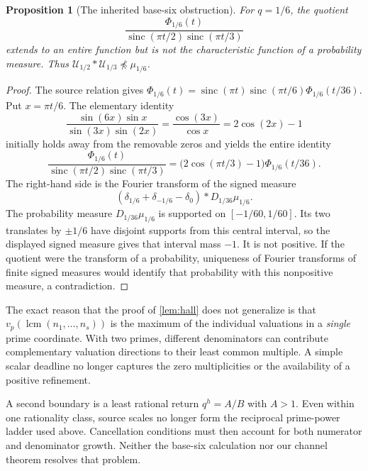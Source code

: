 \documentclass[11pt,letterpaper]{article}
\newtheorem{proposition}[theorem]{Proposition}
\theoremstyle{definition}
\theoremstyle{remark}
\newcommand{\Un}{\mathcal U}
\newcommand{\sinc}{\operatorname{sinc}}
\newcommand{\lcm}{\operatorname{lcm}}
\numberwithin{equation}{section}
\begin{document}
\begin{proposition}[The inherited base-six obstruction]\label{prop:base6}
For $q=1/6$, the quotient
\[
 \frac{\Phi_{1/6}(t)}{\sinc(\pi t/2)\sinc(\pi t/3)}
\]
extends to an entire function but is not the characteristic function of a probability measure. Thus $\Un_{1/2}*\Un_{1/3}\npreceq\mu_{1/6}$.
\end{proposition}
\begin{proof}
The source relation gives
$\Phi_{1/6}(t)=\sinc(\pi t)\sinc(\pi t/6)\Phi_{1/6}(t/36)$. Put $x=\pi t/6$. The elementary identity
\[
 \frac{\sin(6x)\sin x}{\sin(3x)\sin(2x)}
 =\frac{\cos(3x)}{\cos x}=2\cos(2x)-1
\]
initially holds away from the removable zeros and yields the entire identity
\begin{equation}\label{eq:base6}
 \frac{\Phi_{1/6}(t)}{\sinc(\pi t/2)\sinc(\pi t/3)}
 =\bigl(2\cos(\pi t/3)-1\bigr)\Phi_{1/6}(t/36).
\end{equation}
The right-hand side is the Fourier transform of the signed measure
\[
 (\delta_{1/6}+\delta_{-1/6}-\delta_0)*D_{1/36}\mu_{1/6}.
\]
The probability measure $D_{1/36}\mu_{1/6}$ is supported on $[-1/60,1/60]$. Its two translates by $\pm1/6$ have disjoint supports from this central interval, so the displayed signed measure gives that interval mass $-1$. It is not positive. If the quotient were the transform of a probability, uniqueness of Fourier transforms of finite signed measures would identify that probability with this nonpositive measure, a contradiction.
\end{proof}

The exact reason that the proof of \cref{lem:hall} does not generalize is that $v_p(\lcm(n_1,\ldots,n_s))$ is the maximum of the individual valuations in a \emph{single} prime coordinate. With two primes, different denominators can contribute complementary valuation directions to their least common multiple. A simple scalar deadline no longer captures the zero multiplicities or the availability of a positive refinement.

A second boundary is a least rational return $q^h=A/B$ with $A>1$. Even within one rationality class, source scales no longer form the reciprocal prime-power ladder used above. Cancellation conditions must then account for both numerator and denominator growth. Neither the base-six calculation nor our channel theorem resolves that problem.
\end{document}
